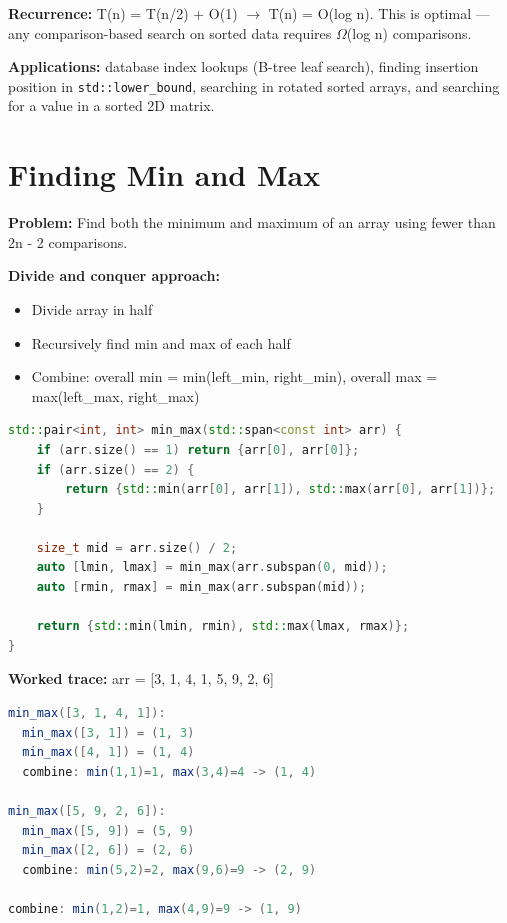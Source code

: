 \textbf{Recurrence:} T(n) = T(n/2) + O(1) $\to$ T(n) = O(log n). This is optimal — any comparison-based search on sorted data requires $\Omega$(log n) comparisons.

\textbf{Applications:} database index lookups (B-tree leaf search), finding insertion position in \texttt{std::lower\_bound}, searching in rotated sorted arrays, and searching for a value in a sorted 2D matrix.

\section{Finding Min and Max}

\textbf{Problem:} Find both the minimum and maximum of an array using fewer than 2n - 2 comparisons.

\textbf{Divide and conquer approach:} 
\begin{itemize}
\item Divide array in half
\item Recursively find min and max of each half
\item Combine: overall min = min(left\_min, right\_min), overall max = max(left\_max, right\_max)
\end{itemize}

\begin{lstlisting}[language=C++]
std::pair<int, int> min_max(std::span<const int> arr) {
    if (arr.size() == 1) return {arr[0], arr[0]};
    if (arr.size() == 2) {
        return {std::min(arr[0], arr[1]), std::max(arr[0], arr[1])};
    }

    size_t mid = arr.size() / 2;
    auto [lmin, lmax] = min_max(arr.subspan(0, mid));
    auto [rmin, rmax] = min_max(arr.subspan(mid));

    return {std::min(lmin, rmin), std::max(lmax, rmax)};
}
\end{lstlisting}

\textbf{Worked trace:} arr = [3, 1, 4, 1, 5, 9, 2, 6]

\begin{lstlisting}[language=Java]
min_max([3, 1, 4, 1]):
  min_max([3, 1]) = (1, 3)
  min_max([4, 1]) = (1, 4)
  combine: min(1,1)=1, max(3,4)=4 -> (1, 4)

min_max([5, 9, 2, 6]):
  min_max([5, 9]) = (5, 9)
  min_max([2, 6]) = (2, 6)
  combine: min(5,2)=2, max(9,6)=9 -> (2, 9)

combine: min(1,2)=1, max(4,9)=9 -> (1, 9)
\end{lstlisting}

